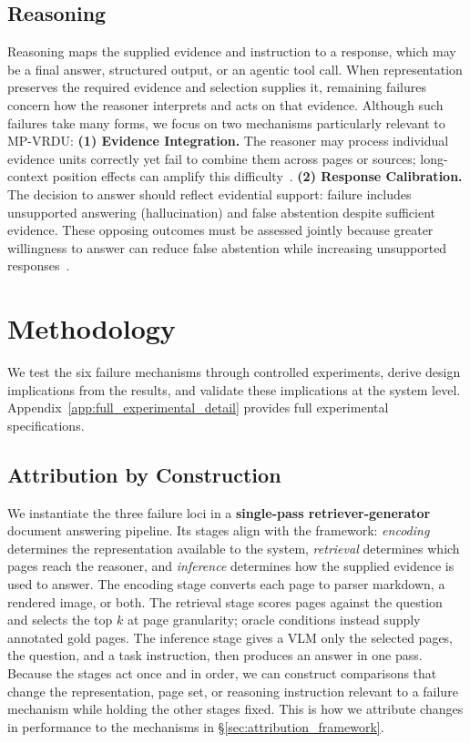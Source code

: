 \documentclass[11pt]{article}
\begin{document}
\subsection{Reasoning}
\label{sec:fm_reasoning}

Reasoning maps the supplied evidence and instruction to a response, which may be a final answer, structured output, or an agentic tool call. When representation preserves the required evidence and selection supplies it, remaining failures concern how the reasoner interprets and acts on that evidence. Although such failures take many forms, we focus on two mechanisms particularly relevant to MP-VRDU:
\textbf{(1) Evidence Integration.} The reasoner may process individual evidence units correctly yet fail to combine them across pages or sources; long-context position effects can amplify this difficulty~\citep{liu2024lost}.
\textbf{(2) Response Calibration.} The decision to answer should reflect evidential support: failure includes unsupported answering (hallucination) and false abstention despite sufficient evidence. These opposing outcomes must be assessed jointly because greater willingness to answer can reduce false abstention while increasing unsupported responses~\citep{whitehead2022reliable}.

\section{Methodology}
\label{sec:methodology}

We test the six failure mechanisms through controlled experiments, derive design implications from the results, and validate these implications at the system level. Appendix~\ref{app:full_experimental_detail} provides full experimental specifications.

\subsection{Attribution by Construction}
\label{sec:attribution}

We instantiate the three failure loci in a \textbf{single-pass retriever-generator} document answering pipeline. Its stages align with the framework: \emph{encoding} determines the representation available to the system, \emph{retrieval} determines which pages reach the reasoner, and \emph{inference} determines how the supplied evidence is used to answer. The encoding stage converts each page to parser markdown, a rendered image, or both. The retrieval stage scores pages against the question and selects the top $k$ at page granularity; oracle conditions instead supply annotated gold pages. The inference stage gives a VLM only the selected pages, the question, and a task instruction, then produces an answer in one pass. Because the stages act once and in order, we can construct comparisons that change the representation, page set, or reasoning instruction relevant to a failure mechanism while holding the other stages fixed. This is how we attribute changes in performance to the mechanisms in \S\ref{sec:attribution_framework}.
\end{document}
